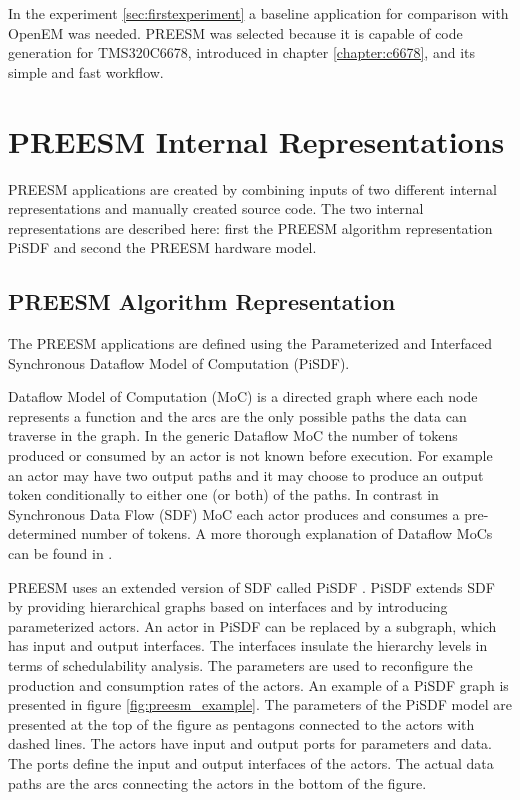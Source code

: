 In the experiment \ref{sec:firstexperiment} a baseline application for comparison with OpenEM was needed. PREESM was selected because it is capable of code generation for TMS320C6678, introduced in chapter \ref{chapter:c6678}, and its simple and fast workflow.

\section{PREESM Internal Representations}
\label{sec:dataflow}
PREESM applications are created by combining inputs of two different internal representations and manually created source code. The two internal representations are described here: first the PREESM algorithm representation PiSDF and second the PREESM hardware model.

\subsection{PREESM Algorithm Representation}
The PREESM applications are defined using the Parameterized and Interfaced Synchronous Dataflow Model of Computation (PiSDF)\cite{pelcat2014preesm}. 

Dataflow Model of Computation (MoC) is a directed graph where each node represents a function and the arcs are the only possible paths the data can traverse in the graph. In the generic Dataflow MoC the number of tokens produced or consumed by an actor is not known before execution. For example an actor may have two output paths and it may choose to produce an output token conditionally to either one (or both) of the paths. In contrast in Synchronous Data Flow (SDF) MoC each actor produces and consumes a pre-determined number of tokens. \cite{lee1987synchronous} A more thorough explanation of Dataflow MoCs can be found in \cite{lee2015introduction}.

PREESM uses an extended version of SDF called PiSDF \cite{pelcat2014preesm}. PiSDF extends SDF by providing hierarchical graphs based on interfaces and by introducing parameterized actors. An actor in PiSDF can be replaced by a subgraph, which has input and output interfaces. The interfaces insulate the hierarchy levels in terms of schedulability analysis. The parameters are used to reconfigure the production and consumption rates of the actors. \cite{desnos2013pimm} An example of a PiSDF graph is presented in figure \ref{fig:preesm_example}. The parameters of the PiSDF model are presented at the top of the figure as pentagons connected to the actors with dashed lines. The actors have input and output ports for parameters and data. The ports define the input and output interfaces of the actors. The actual data paths are the arcs connecting the actors in the bottom of the figure.

